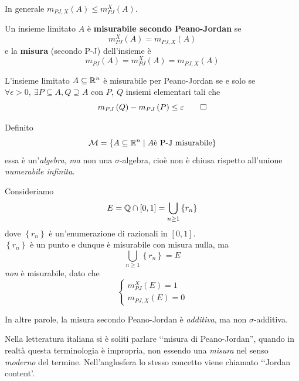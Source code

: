 	In generale $m_{PJ,X}\left(A\right)\leq m_{PJ}^{X}\left(A\right)$.
	\begin{define}
		Un insieme limitato $A$ è \textbf{misurabile secondo Peano-Jordan} se
		\begin{equation}
			m_{PJ}^X\left(A\right)=m_{PJ,X}\left(A\right)
		\end{equation}
	e la \textbf{misura} (secondo P-J) dell'insieme è
		\begin{equation}
			m_{PJ}\left(A\right)=m_{PJ}^X\left(A\right)=m_{PJ,X}\left(A\right)
		\end{equation}
	\end{define}
	\begin{propositionqed}
		L'insieme limitato $A\subseteq \realset^n$ è misurabile per Peano-Jordan se e solo se $\forall \epsilon>0,\ \exists P\subseteq A, Q\supseteq A$ con $P,\ Q$ insiemi elementari tali che
		\begin{equation}
			m_{PJ}\left(Q\right)-m_{PJ}\left(P\right)\leq \epsilon\qedhere
		\end{equation}
	\end{propositionqed}
	Definito
	\begin{equation}
		\mathcal{M}=\left\{A\subseteq \realset^n\mid A\text{è P-J misurabile}\right\}
	\end{equation}
	essa è un'\textit{algebra}, \textit{ma} non una $\sigma$-algebra, cioè non è chiusa rispetto all'unione \textit{numerabile infinita}.
	\begin{examplewt}
		Consideriamo
		\begin{equation*}
			E=\rationalset\cap\left[0,1\right]=\bigcup_{n\geq 1}\left\{r_n\right\}
		\end{equation*}
		dove $\left\{r_n\right\}$ è un'enumerazione di razionali in $\left[0,1\right]$.\\
		$\left\{r_n\right\}$ è un punto e dunque è misurabile con misura nulla, ma \begin{equation*}
			\bigcup_{n\geq 1}\left\{r_n\right\}=E
		\end{equation*}
		\textit{non} è misurabile, dato che
		\begin{equation*}
			\begin{cases}
				m_{PJ}^X\left(E\right)=1\\
				m_{PJ,X}\left(E\right)=0
			\end{cases}
		\end{equation*}
	\end{examplewt}
	In altre parole, la misura secondo Peano-Jordan è \textit{additiva}, ma non $\sigma$-additiva.
	\begin{digression}
		Nella letteratura italiana si è soliti parlare ‘‘misura di Peano-Jordan'', quando in realtà questa terminologia è impropria, non essendo una \textit{misura} nel senso \textit{moderno} del termine. Nell'anglosfera lo stesso concetto viene chiamato ‘‘Jordan content'.
	\end{digression}
